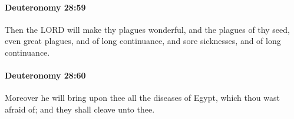 		\paragraph{Deuteronomy 28:59} %
			\label{DEUTERONOMY-28-59}

			Then the LORD will make thy plagues wonderful, and the plagues of thy seed, even great plagues, and of long continuance, and sore sicknesses, and of long continuance.


		\paragraph{Deuteronomy 28:60} %
			\label{DEUTERONOMY-28-60}

			Moreover he will bring upon thee all the diseases of Egypt, which thou wast afraid of; and they shall cleave unto thee.


